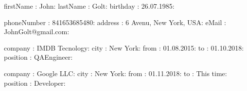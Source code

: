 
firstName : John:
lastName : Golt:
birthday : 26.07.1985:


phoneNumber : 841653685480:
address : 6 Avenu, New York, USA:
eMail : JohnGolt@gmail.com:


company : IMDB Tecnology:
city : New York:
from : 01.08.2015:
to : 01.10.2018:
position : QAEngineer:

company : Google LLC:
city : New York:
from : 01.11.2018:
to  : This time:
position : Developer:


